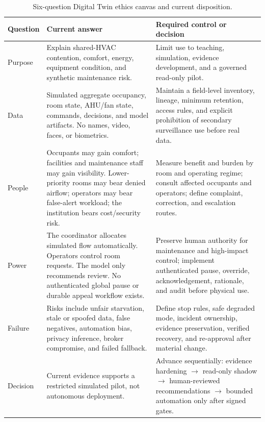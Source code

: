 \begin{table}[H]
\centering
\caption{Six-question Digital Twin ethics canvas and current disposition.}
\label{tab:ethics-canvas}
\begin{tabularx}{\textwidth}{L{0.13\textwidth}Y Y}
\toprule
Question & Current answer & Required control or decision\\
\midrule
Purpose & Explain shared-HVAC contention, comfort, energy, equipment condition, and synthetic maintenance risk. & Limit use to teaching, simulation, evidence development, and a governed read-only pilot.\\
Data & Simulated aggregate occupancy, room state, AHU/fan state, commands, decisions, and model artifacts. No names, video, faces, or biometrics. & Maintain a field-level inventory, lineage, minimum retention, access rules, and explicit prohibition of secondary surveillance use before real data.\\
People & Occupants may gain comfort; facilities and maintenance staff may gain visibility. Lower-priority rooms may bear denied airflow; operators may bear false-alert workload; the institution bears cost/security risk. & Measure benefit and burden by room and operating regime; consult affected occupants and operators; define complaint, correction, and escalation routes.\\
Power & The coordinator allocates simulated flow automatically. Operators control room requests. The model only recommends review. No authenticated global pause or durable appeal workflow exists. & Preserve human authority for maintenance and high-impact control; implement authenticated pause, override, acknowledgement, rationale, and audit before physical use.\\
Failure & Risks include unfair starvation, stale or spoofed data, false negatives, automation bias, privacy inference, broker compromise, and failed fallback. & Define stop rules, safe degraded mode, incident ownership, evidence preservation, verified recovery, and re-approval after material change.\\
Decision & Current evidence supports a restricted simulated pilot, not autonomous deployment. & Advance sequentially: evidence hardening $\rightarrow$ read-only shadow $\rightarrow$ human-reviewed recommendations $\rightarrow$ bounded automation only after signed gates.\\
\bottomrule
\end{tabularx}
\end{table}

